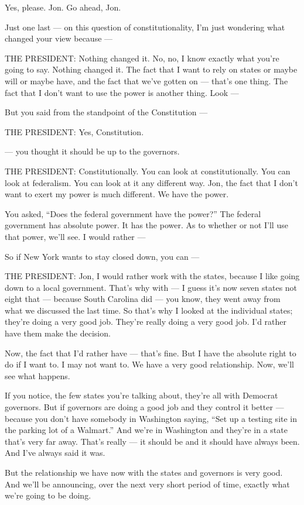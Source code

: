 Yes, please. Jon. Go ahead, Jon.

Just one last --- on this question of constitutionality, I'm just
wondering what changed your view because ---

THE PRESIDENT: Nothing changed it. No, no, I know exactly what you're
going to say. Nothing changed it. The fact that I want to rely on states
or maybe will or maybe have, and the fact that we've gotten on ---
that's one thing. The fact that I don't want to use the power is another
thing. Look ---

But you said from the standpoint of the Constitution ---

THE PRESIDENT: Yes, Constitution.

--- you thought it should be up to the governors.

THE PRESIDENT: Constitutionally. You can look at constitutionally. You
can look at federalism. You can look at it any different way. Jon, the
fact that I don't want to exert my power is much different. We have the
power.

You asked, ``Does the federal government have the power?'' The federal
government has absolute power. It has the power. As to whether or not
I'll use that power, we'll see. I would rather ---

So if New York wants to stay closed down, you can ---

THE PRESIDENT: Jon, I would rather work with the states, because I like
going down to a local government. That's why with --- I guess it's now
seven states not eight that --- because South Carolina did --- you know,
they went away from what we discussed the last time. So that's why I
looked at the individual states; they're doing a very good job. They're
really doing a very good job. I'd rather have them make the decision.

Now, the fact that I'd rather have --- that's fine. But I have the
absolute right to do if I want to. I may not want to. We have a very
good relationship. Now, we'll see what happens.

If you notice, the few states you're talking about, they're all with
Democrat governors. But if governors are doing a good job and they
control it better --- because you don't have somebody in Washington
saying, ``Set up a testing site in the parking lot of a Walmart.'' And
we're in Washington and they're in a state that's very far away. That's
really --- it should be and it should have always been. And I've always
said it was.

But the relationship we have now with the states and governors is very
good. And we'll be announcing, over the next very short period of time,
exactly what we're going to be doing.

